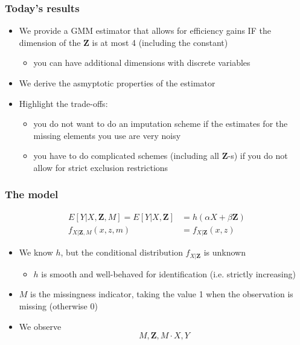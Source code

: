\documentclass[compress,mathserif]{beamer}
\begin{document}
\begin{frame}\frametitle{Today's results}\hypertarget{Today's results}{}
\begin{itemize}
\item We provide a GMM estimator that allows for efficiency gains IF the dimension of the $\mathbf{Z}$ is at most 4  (including the constant)
\begin{itemize}
\item you can have additional dimensions with discrete variables
\end{itemize}

\item We derive the asmyptotic properties of the estimator

\item Highlight the trade-offs:
\begin{itemize}
\item you do not want to do an imputation scheme if the estimates for the missing elements you use are very noisy

\item you have to do complicated schemes (including all $\mathbf{Z}$-s) if you do not allow for strict exclusion restrictions 


\end{itemize}

\end{itemize}
\end{frame}



\begin{frame}\frametitle{The model}\hypertarget{The model}{}
\begin{align*}
   E[Y|X,\mathbf{Z},M]= E[Y|X,\mathbf{Z}] & = h(\alpha X+\beta \mathbf{Z})\\
    f_{X|\mathbf{Z}, M}(x,z,m)&= f_{X|\mathbf{Z}}(x,z)
\end{align*}
\begin{itemize}
\item We know $h$, but the conditional distribution $f_{X|\mathbf{Z}}$ is unknown
\begin{itemize}
\item $h$ is smooth and well-behaved for identification (i.e. strictly increasing)
\end{itemize}

\item $M$ is the missingness indicator, taking the value 1 when the observation is missing (otherwise 0)

\item We observe
\[M, \mathbf{Z}, M\cdot X, Y
\]


\end{itemize}
\end{frame}
\end{document}
